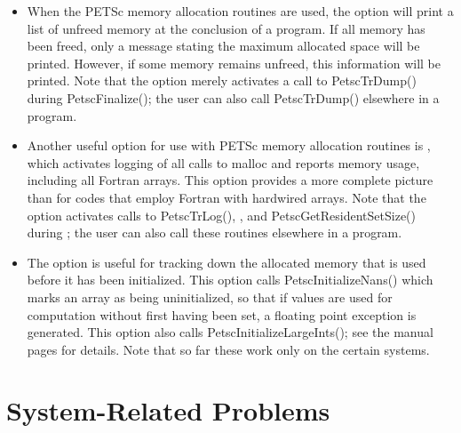 {{\begin{itemize}
 
\item When the PETSc memory allocation routines are used, the option 
 will print a list of unfreed memory at the conclusion of a
program.  If all memory has been freed, only a message stating
the maximum allocated space will be printed.  However, if some memory
remains unfreed, this information will be printed.  Note that the
option  merely activates a call to PetscTrDump() during
PetscFinalize(); the user can also call PetscTrDump() elsewhere
in a program.

 
 
\item Another useful option for use with PETSc memory allocation
routines is , which activates logging of all calls
to malloc and reports memory usage, including all Fortran arrays.
This option provides a more complete picture than  for
codes that employ Fortran with hardwired arrays.  Note that the option
 activates calls to PetscTrLog(), , and PetscGetResidentSetSize() during ; the user can also call these routines elsewhere in a
program.

 
\item The option  is useful for tracking down the
allocated memory that is used before it has been initialized.  This
option calls PetscInitializeNans() which marks an array as being
uninitialized, so that if values are used for computation without
first having been set, a floating point exception is generated.  This
option also calls {PetscInitializeLargeInts()}; see the manual pages for
details.  Note that so far these work only on the certain systems.

\end{itemize}

%
%
\section{System-Related Problems}

}}
